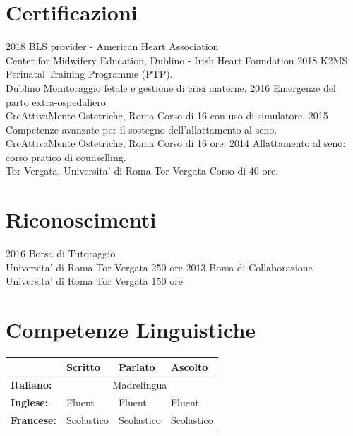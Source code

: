 \documentclass[11pt]{friggeri-cv}
\begin{document}
\section{Certificazioni}
\begin{entrylist}
  \entry
    {2018}
    {BLS provider - American Heart Association}
    {\\Center for Midwifery Education, Dublino - Irish Heart Foundation}
    {}
  \entry
    {2018}
    {K2MS Perinatal Training Programme (PTP).}
    {\\Dublino}
    {Monitoraggio fetale e gestione di crisi materne.}
  \entry
	  {2016}
	  {Emergenze del parto extra-ospedaliero}
	  {\\CreAttivaMente Ostetriche, Roma}
	  {Corso di 16 con uso di simulatore.}
  \entry
	  {2015}
	  {Competenze avanzate per il sostegno dell’allattamento al seno.}
	  {\\CreAttivaMente Ostetriche, Roma }
	  {Corso di 16 ore.}
  \entry
  {2014}
  {Allattamento al seno: corso pratico di counselling.}
  {\\Tor Vergata, Universita' di Roma Tor Vergata}
  {Corso di 40 ore.}
\end{entrylist}

\vspace{-20pt}
\section{Riconoscimenti}
\begin{entrylist}
  \entry
    {2016}
    {Borsa di Tutoraggio}
    {\\Universita' di Roma Tor Vergata}
    {250 ore}
  \entry
    {2013}
    {Borsa di Collaborazione}
    {\\Universita' di Roma Tor Vergata}
    {150 ore}
\end{entrylist}

\vspace{-20pt}
\section{Competenze Linguistiche}
\begin{table}[!h]
	\centering
  \renewcommand{\arraystretch}{1.45}
	\begin{tabular}{ p{3cm} p{3cm} p{3cm} p{3cm} }
    \hline
		& \textbf{Scritto} 	& \textbf{Parlato} & \textbf{Ascolto}			\\     \hline
		\textbf{Italiano:}	& \multicolumn{3}{c}{Madrelingua}					\\     
		\textbf{Inglese:} 	& Fluent & Fluent & Fluent \\   
		\textbf{Francese:}	& Scolastico	& Scolastico	& Scolastico \\    \hline
	\end{tabular}
\end{table}
\newpage
\end{document}
